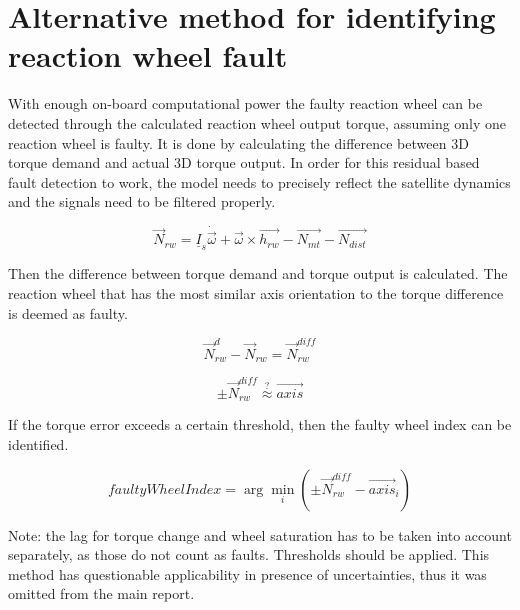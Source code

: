 \chapter{Alternative method for identifying reaction wheel fault} \label{chap:E}

With enough on-board computational power the faulty reaction wheel can be detected through the calculated reaction wheel output torque, assuming only one reaction wheel is faulty. It is done by calculating the difference between 3D torque demand and actual 3D torque output. In order for this residual based fault detection to work, the model needs to precisely reflect the satellite dynamics and the signals need to be filtered properly.

\begin{equation}
\vec{N}_{rw} = \underline{I}_s \dot{\vec{\omega}}  + \vec{\omega} \times \vec{h_{rw}} - \vec{N_{mt}} - \vec{N_{dist}}
\end{equation}

Then the difference between torque demand and torque output is calculated. The reaction wheel that has the most similar axis orientation to the torque difference is deemed as faulty.

\begin{equation}
\vec{N}_{rw}^{d} - \vec{N}_{rw} = 
\vec{N}_{rw}^{diff}
\end{equation}

\begin{equation}
 \pm \vec{N}_{rw}^{diff}  \stackrel{?}{\approx} \vec{axis} 
\end{equation}

If the torque error exceeds a certain threshold, then the faulty wheel index can be identified.

\begin{equation}
faultyWheelIndex = \arg\min_i ( \pm \vec{N}_{rw}^{diff} - \vec{axis}_i ) 
\end{equation}


Note: the lag for torque change and wheel saturation has to be taken into account separately, as those do not count as faults. 
Thresholds should be applied. This method has questionable applicability in presence of uncertainties, thus it was omitted from the main report.